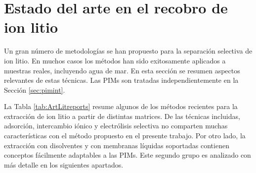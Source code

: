 \section{Estado del arte en el recobro de ion litio}\label{sec:estadodelarte}
Un gran número de metodologías se han propuesto para la separación selectiva de ion litio. En muchos casos los métodos han sido exitosamente aplicados a muestras reales, incluyendo agua de mar. En esta sección se resumen aspectos relevantes de estas técnicas. Las \acp{PIM} son tratadas independientemente en la Sección \ref{sec:pimint}.

La Tabla \ref{tab:ArtLitreports} resume algunos de los métodos recientes para la extracción de ion litio a partir de distintas matrices. De las técnicas incluidas, adsorción, intercambio iónico y electrólisis selectiva no comparten muchas características con el método propuesto en el presente trabajo. Por otro lado, la extracción con disolventes y con membranas líquidas soportadas contienen conceptos fácilmente adaptables a las \acp{PIM}. Este segundo grupo es analizado con más detalle en los siguientes apartados.

